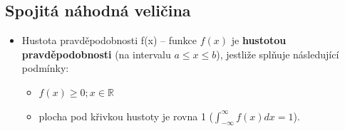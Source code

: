\subsection{Spojitá náhodná veličina}
\begin{itemize}
	\item[\pointing] Hustota pravděpodobnosti f(x) -- funkce $f(x)$ je \textbf{hustotou pravděpodobnosti} (na intervalu $a \leq x \leq b$), jestliže splňuje následující podmínky:
	\begin{itemize}
		\item $f(x) \geq 0; x \in \mathbb{R}$
		\item plocha pod křivkou hustoty je rovna 1 ($\int_{-\infty}^{\infty} f(x)dx = 1$).
	\end{itemize}
\end{itemize}

